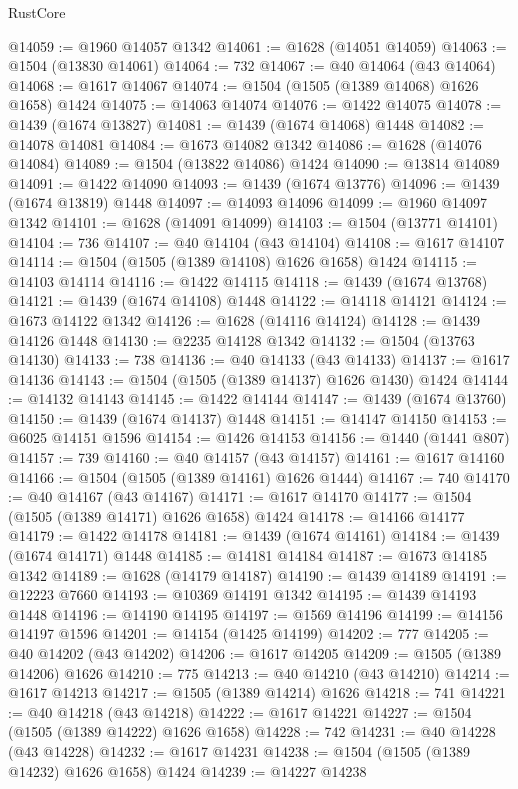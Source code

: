 \begin{lexlean}{RustCore}
\begin{coremodule}
@14059 := @1960 @14057 @1342
@14061 := @1628 (@14051 @14059)
@14063 := @1504 (@13830 @14061)
@14064 := 732
@14067 := @40 @14064 (@43 @14064)
@14068 := @1617 @14067
@14074 := @1504 (@1505 (@1389 @14068) @1626 @1658) @1424
@14075 := @14063 @14074
@14076 := @1422 @14075
@14078 := @1439 (@1674 @13827)
@14081 := @1439 (@1674 @14068) @1448
@14082 := @14078 @14081
@14084 := @1673 @14082 @1342
@14086 := @1628 (@14076 @14084)
@14089 := @1504 (@13822 @14086) @1424
@14090 := @13814 @14089
@14091 := @1422 @14090
@14093 := @1439 (@1674 @13776)
@14096 := @1439 (@1674 @13819) @1448
@14097 := @14093 @14096
@14099 := @1960 @14097 @1342
@14101 := @1628 (@14091 @14099)
@14103 := @1504 (@13771 @14101)
@14104 := 736
@14107 := @40 @14104 (@43 @14104)
@14108 := @1617 @14107
@14114 := @1504 (@1505 (@1389 @14108) @1626 @1658) @1424
@14115 := @14103 @14114
@14116 := @1422 @14115
@14118 := @1439 (@1674 @13768)
@14121 := @1439 (@1674 @14108) @1448
@14122 := @14118 @14121
@14124 := @1673 @14122 @1342
@14126 := @1628 (@14116 @14124)
@14128 := @1439 @14126 @1448
@14130 := @2235 @14128 @1342
@14132 := @1504 (@13763 @14130)
@14133 := 738
@14136 := @40 @14133 (@43 @14133)
@14137 := @1617 @14136
@14143 := @1504 (@1505 (@1389 @14137) @1626 @1430) @1424
@14144 := @14132 @14143
@14145 := @1422 @14144
@14147 := @1439 (@1674 @13760)
@14150 := @1439 (@1674 @14137) @1448
@14151 := @14147 @14150
@14153 := @6025 @14151 @1596
@14154 := @1426 @14153
@14156 := @1440 (@1441 @807)
@14157 := 739
@14160 := @40 @14157 (@43 @14157)
@14161 := @1617 @14160
@14166 := @1504 (@1505 (@1389 @14161) @1626 @1444)
@14167 := 740
@14170 := @40 @14167 (@43 @14167)
@14171 := @1617 @14170
@14177 := @1504 (@1505 (@1389 @14171) @1626 @1658) @1424
@14178 := @14166 @14177
@14179 := @1422 @14178
@14181 := @1439 (@1674 @14161)
@14184 := @1439 (@1674 @14171) @1448
@14185 := @14181 @14184
@14187 := @1673 @14185 @1342
@14189 := @1628 (@14179 @14187)
@14190 := @1439 @14189
@14191 := @12223 @7660
@14193 := @10369 @14191 @1342
@14195 := @1439 @14193 @1448
@14196 := @14190 @14195
@14197 := @1569 @14196
@14199 := @14156 @14197 @1596
@14201 := @14154 (@1425 @14199)
@14202 := 777
@14205 := @40 @14202 (@43 @14202)
@14206 := @1617 @14205
@14209 := @1505 (@1389 @14206) @1626
@14210 := 775
@14213 := @40 @14210 (@43 @14210)
@14214 := @1617 @14213
@14217 := @1505 (@1389 @14214) @1626
@14218 := 741
@14221 := @40 @14218 (@43 @14218)
@14222 := @1617 @14221
@14227 := @1504 (@1505 (@1389 @14222) @1626 @1658)
@14228 := 742
@14231 := @40 @14228 (@43 @14228)
@14232 := @1617 @14231
@14238 := @1504 (@1505 (@1389 @14232) @1626 @1658) @1424
@14239 := @14227 @14238

\end{coremodule}
\end{lexlean}
